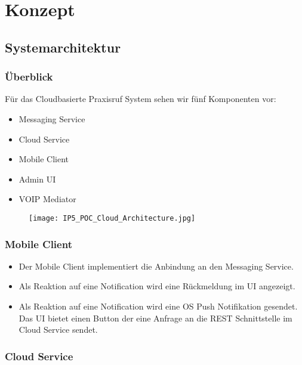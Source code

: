\section{Konzept}

\subsection{Systemarchitektur}

    \subsubsection*{Überblick}

    Für das Cloudbasierte Praxisruf System sehen wir fünf Komponenten vor: 

    \begin{itemize}
        \item Messaging Service
        \item Cloud Service
        \item Mobile Client
        \item Admin UI
        \item VOIP Mediator
    \end{itemize}


    \begin{figure}[H]
    \centering
    \texttt{[image: IP5\_POC\_Cloud\_Architecture.jpg]}
    \end{figure}


    \subsubsection*{Mobile Client}

        \begin{itemize}
            \item Der Mobile Client implementiert die Anbindung an den Messaging Service. 
            \item Als Reaktion auf eine Notification wird eine Rückmeldung im UI angezeigt. 
            \item Als Reaktion auf eine Notification wird eine OS Push Notifikation gesendet. 
            Das UI bietet einen Button der eine Anfrage an die REST Schnittstelle im Cloud Service sendet. 
        \end{itemize}


    \subsubsection*{Cloud Service}

